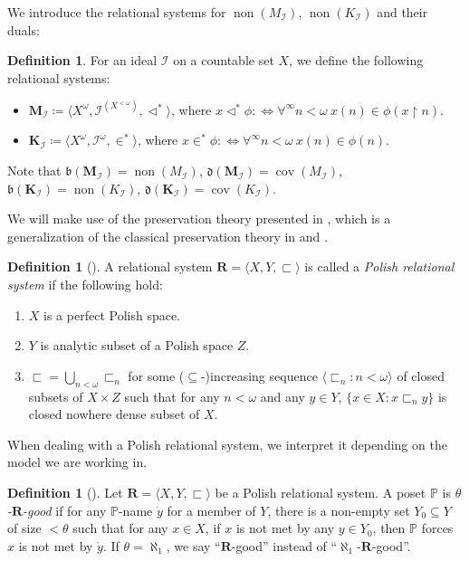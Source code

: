 \documentclass[a4paper,12pt]{amsart}
\theoremstyle{definition}
\newtheorem{dfn}[thm]{Definition}
\numberwithin{thm}{section}
\numberwithin{equation}{section}
\newcommand{\p}{\mathbb{P}}
\newcommand{\on}{\mathpunct{\upharpoonright}}
\newcommand{\bb}{\mathfrak{b}}
\newcommand{\dd}{\mathfrak{d}}
\DeclareMathOperator{\non}{non}
\DeclareMathOperator{\cov}{cov}
\newcommand{\R}{\mathbf{R}}
\newcommand{\I}{\mathscr{I}}
\begin{document}
    We introduce the relational systems for $\non(M_\I)$, $\non(K_\I)$ and their duals:
    
    \begin{dfn}
        For an ideal $\I$ on a countable set $X$, we define the following relational systems:
        \begin{itemize}
            \item $\mathbf{M}_{\I}\coloneqq\langle X^\omega,\I^{(X^{<\omega})}, \triangleleft^* \rangle$, where $x\triangleleft^*\phi:\Leftrightarrow\forall^\infty n<\omega~x(n)\in\phi(x\on n)$.
            \item $\mathbf{K}_{\I}\coloneqq\langle X^\omega,\I^{\omega}, \in^* \rangle$, where $x\in^*\phi:\Leftrightarrow\forall^\infty n<\omega~x(n)\in\phi(n)$.
        \end{itemize}
        Note that $\bb(\mathbf{M}_{\I})=\non(M_\I)$, $\dd(\mathbf{M}_{\I})=\cov(M_\I)$, $\bb(\mathbf{K}_{\I})=\non(K_\I)$, $\dd(\mathbf{K}_{\I})=\cov(K_\I)$.
    \end{dfn}
    
    We will make use of the preservation theory presented in \cite{CM19}, which is a generalization of the classical preservation theory in \cite{JS90} and \cite{Bre91}.
    
    \begin{dfn}[{\cite[Definition 4.1]{CM19}}]
    	A relational system $\R=\langle X,Y,\sqsubset\rangle$ is called a \emph{Polish relational system} if the following hold:
    	\begin{enumerate}
    		\item $X$ is a perfect Polish space.
    		\item  $Y$ is analytic subset of a Polish space $Z$.
    		\item $\sqsubset =\bigcup_{n<\omega}\sqsubset_n$ for some ($\subseteq$-)increasing sequence  $\langle \sqsubset_n:n<\omega\rangle$ of closed subsets of $X\times Z$ such that for any $n<\omega$ and any $y\in Y$, $\{x\in X\colon x\sqsubset_n y\}$ is closed nowhere dense subset of $X$.
    	\end{enumerate}
    	When dealing with a Polish relational system, we interpret it depending on the model we are working in.
    \end{dfn}
    
    \begin{dfn}[{\cite{JS90}}]
        Let $\R=\langle X,Y,\sqsubset\rangle$ be a Polish relational system. A poset $\p$ is \emph{$\theta$-$\R$-good} if for any $\p$-name $\dot{y}$ for a member of $Y$, there is a non-empty set $Y_0\subseteq Y$ of size $<\theta$ such that for any $x\in X$, if $x$ is not met by any $y\in Y_0$, then $\p$ forces $x$ is not met by $\dot{y}$. If $\theta=\aleph_1$, we say ``$\R$-good'' instead of ``$\aleph_1$-$\R$-good''.
    \end{dfn}
    
\end{document}
